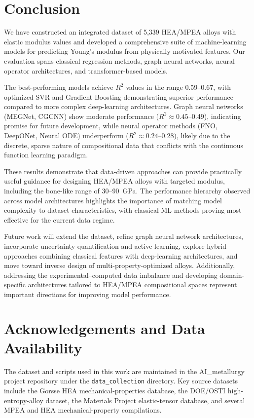 \documentclass[11pt,a4paper]{article}
\begin{document}
\section{Conclusion}

We have constructed an integrated dataset of 5{,}339 HEA/MPEA alloys with elastic modulus values and developed a comprehensive suite of machine-learning models for predicting Young's modulus from physically motivated features. Our evaluation spans classical regression methods, graph neural networks, neural operator architectures, and transformer-based models.

The best-performing models achieve $R^2$ values in the range 0.59--0.67, with optimized SVR and Gradient Boosting demonstrating superior performance compared to more complex deep-learning architectures. Graph neural networks (MEGNet, CGCNN) show moderate performance ($R^2 \approx 0.45$--0.49), indicating promise for future development, while neural operator methods (FNO, DeepONet, Neural ODE) underperform ($R^2 \approx 0.24$--0.28), likely due to the discrete, sparse nature of compositional data that conflicts with the continuous function learning paradigm.

These results demonstrate that data-driven approaches can provide practically useful guidance for designing HEA/MPEA alloys with targeted modulus, including the bone-like range of 30--90~GPa. The performance hierarchy observed across model architectures highlights the importance of matching model complexity to dataset characteristics, with classical ML methods proving most effective for the current data regime.

Future work will extend the dataset, refine graph neural network architectures, incorporate uncertainty quantification and active learning, explore hybrid approaches combining classical features with deep-learning architectures, and move toward inverse design of multi-property-optimized alloys. Additionally, addressing the experimental--computed data imbalance and developing domain-specific architectures tailored to HEA/MPEA compositional spaces represent important directions for improving model performance.

\section*{Acknowledgements and Data Availability}

The dataset and scripts used in this work are maintained in the AI\_metallurgy project repository under the \texttt{data\_collection} directory. Key source datasets include the Gorsse HEA mechanical-properties database, the DOE/OSTI high-entropy-alloy dataset, the Materials Project elastic-tensor database, and several MPEA and HEA mechanical-property compilations.
\end{document}
